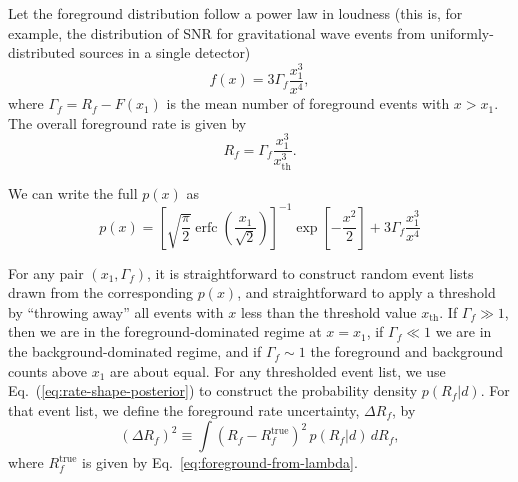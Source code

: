 \documentclass[aps,prd,reprint,nofootinbib]{revtex4-1}
\DeclareMathOperator{\erfc}{erfc}
\begin{document}
Let the foreground distribution follow a power law in loudness (this
is, for example, the distribution of SNR for gravitational wave events
from uniformly-distributed sources in a single detector)
\begin{equation}
\label{eq:ps}
f(x) = 3 \Gamma_f \frac{x_1^3}{x^4},
\end{equation}
where $\Gamma_f = R_f - F\left(x_1\right)$ is the mean number of
foreground events with $x > x_1$.  The overall foreground rate is
given by 
\begin{equation}
  \label{eq:foreground-from-lambda}
  R_f = \Gamma_f \frac{x_1^3}{x_\mathrm{th}^3}.
\end{equation}

We can write the full $p(x)$ as
\begin{equation}
\label{eq:ptot} 
p(x) = \left[\sqrt{\frac{\pi}{2}}
  \erfc\left(\frac{x_1}{\sqrt{2}}\right)\right]^{-1}\exp\left[-\frac{x^2}{2}\right]
+ 3 \Gamma_f \frac{x_1^3}{x^4}
\end{equation}

For any pair $(x_1, \Gamma_f)$, it is straightforward to construct
random event lists drawn from the corresponding $p(x)$, and
straightforward to apply a threshold by ``throwing away'' all events
with $x$ less than the threshold value $x_\mathrm{th}$.  If $\Gamma_f
\gg 1$, then we are in the foreground-dominated regime at $x = x_1$,
if $\Gamma_f \ll 1$ we are in the background-dominated regime, and if
$\Gamma_f \sim 1$ the foreground and background counts above $x_1$
are about equal.  For any thresholded event list, we use
Eq.~(\ref{eq:rate-shape-posterior}) to construct the probability
density $p(R_f|d)$.  For that event list, we define the foreground
rate uncertainty, $\Delta R_f$, by
\begin{equation}
\label{eq:delta-R-definition}
(\Delta R_f)^2 \equiv \int{(R_f - R_f^\mathrm{true})^2 \, p(R_f|d)\, dR_f },
\end{equation}
where $R_f^\mathrm{true}$ is given by
Eq.~\eqref{eq:foreground-from-lambda}.
\end{document}
